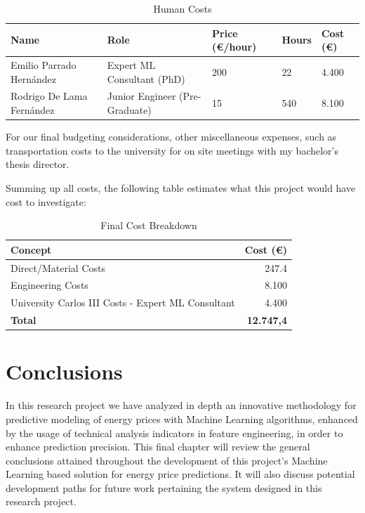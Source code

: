 \documentclass[12pt]{report} %
\begin{document}
\begin{table}[H]
	\caption{Human Costs}
	\centering
	\begin{tabular}{|P{4cm}|P{3.5cm}|P{1.8cm}|P{1.5cm}|P{1.5cm}|}
		\hline
		\textbf{Name} & \textbf{Role} & \textbf{Price (€/hour)} & \textbf{Hours} & \textbf{Cost (€)} \\
		\hline
		Emilio Parrado Hernández & Expert ML Consultant (PhD) & 200 & 22 & 4.400 \\
		\hline
		Rodrigo De Lama Fernández & Junior Engineer (Pre-Graduate) & 15 & 540 & 8.100 \\
		\hline
	\end{tabular}
\end{table}

For our final budgeting considerations, other miscellaneous expenses, such as transportation costs to the university for on site meetings with my bachelor's thesis director.

Summing up all costs, the following table estimates what this project would have cost to investigate:

\begin{table}[H]
    \caption{Final Cost Breakdown}
    \centering
    \begin{tabular}{|l|r|}
        \hline
        \textbf{Concept} & \textbf{Cost (€)} \\
        \hline
        Direct/Material Costs & 247.4 \\
        Engineering Costs & 8.100 \\
        University Carlos III Costs - Expert ML Consultant & 4.400 \\
        \hline
        \textbf{Total} & \textbf{12.747,4} \\
        \hline
    \end{tabular}
\end{table}



\chapter{Conclusions}
\label{chap:07}
In this research project we have analyzed in depth an innovative methodology for predictive modeling of energy prices with Machine Learning algorithms, enhanced by the usage of technical analysis indicators in feature engineering, in order to enhance prediction precision. This final chapter will review the general conclusions attained throughout the development of this project's Machine Learning based solution for energy price predictions. It will also discuss potential development paths for future work pertaining the system designed in this research project.
\end{document}
